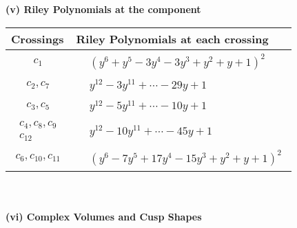 \documentclass[1p]{elsarticle_modified}
\theoremstyle{definition}
\begin{document}
\newpage\renewcommand{\arraystretch}{1}
\flushleft \textbf{(v) Riley Polynomials at the component}\newline \\
\begin{tabular}{m{50pt}|m{274pt}}
Crossings & \hspace{64pt}Riley Polynomials at each crossing \\
\hline $$\begin{aligned}c_{1}\end{aligned}$$&$\begin{aligned}
&(y^6+y^5-3 y^4-3 y^3+y^2+y+1)^2
\end{aligned}$\\
\hline $$\begin{aligned}c_{2},c_{7}\end{aligned}$$&$\begin{aligned}
&y^{12}-3 y^{11}+\cdots-29 y+1
\end{aligned}$\\
\hline $$\begin{aligned}c_{3},c_{5}\end{aligned}$$&$\begin{aligned}
&y^{12}-5 y^{11}+\cdots-10 y+1
\end{aligned}$\\
\hline $$\begin{aligned}c_{4},c_{8},c_{9}\\c_{12}\end{aligned}$$&$\begin{aligned}
&y^{12}-10 y^{11}+\cdots-45 y+1
\end{aligned}$\\
\hline $$\begin{aligned}c_{6},c_{10},c_{11}\end{aligned}$$&$\begin{aligned}
&(y^6-7 y^5+17 y^4-15 y^3+y^2+y+1)^2
\end{aligned}$\\
\hline
\end{tabular}\\~\\
\newpage\flushleft \textbf{(vi) Complex Volumes and Cusp Shapes}
\end{document}
